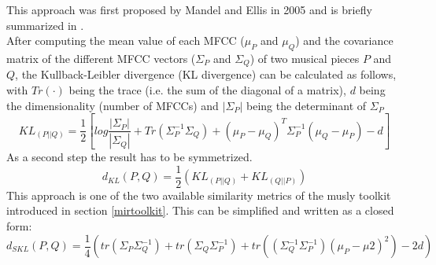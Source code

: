 This approach was first proposed by Mandel and Ellis \cite{mandelellis1} in 2005 and is briefly summarized in \cite[pp. 65f]{knees1}.\\
After computing the mean value of each MFCC ($\mu_P$ and $\mu_Q$) and the covariance matrix of the different MFCC vectors ($\Sigma_P$ and $\Sigma_Q$) of two musical pieces $P$ and $Q$, the Kullback-Leibler divergence (KL divergence) can be calculated as follows, with $Tr(\cdot)$ being the trace (i.e. the sum of the diagonal of a matrix), $d$ being the dimensionality (number of MFCCs) and $|\Sigma_P|$ being the determinant of $\Sigma_P$\\
\begin{equation} \label{eq:KL1}
KL_{(P||Q)} = \frac{1}{2}[log\frac{|\Sigma_P|}{|\Sigma_Q|} + Tr(\Sigma_P^{-1}\Sigma_Q) + (\mu_P - \mu_Q)^T \Sigma_P^{-1} (\mu_Q - \mu_P) - d]
\end{equation}
As a second step the result has to be symmetrized.
\begin{equation} \label{eq:KL2}
d_{KL}(P, Q) = \frac{1}{2} (KL_{(P||Q)} + KL_{(Q||P)}) 
\end{equation}
This approach is one of the two available similarity metrics of the musly \cite{musly1} toolkit introduced in section \ref{mirtoolkit}.
This can be simplified and written as a closed form:
\begin{equation} \label{eq:SKL}
d_{SKL}(P, Q) = \frac{1}{4} (tr(\Sigma_P\Sigma_Q^{-1}) + tr(\Sigma_Q\Sigma_P^{-1}) + tr((\Sigma_Q^{-1}\Sigma_P^{-1})(\mu_P - \mu2)^2) - 2d)
\end{equation}

